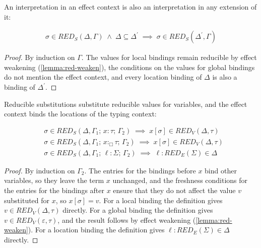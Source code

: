 \documentclass[acmsmall, screen, review, anonymous]{acmart}
\theoremstyle{definition}
\newcommand{\loc}{\ell}
\newcommand{\types}{\mathrel{:}}
\newcommand{\gtypes}{\mathrel{:_{\Box}}}
\newcommand{\cempty}{\varepsilon}
\newcommand{\ccons}[2]{#1;\,#2}
\newcommand{\lbind}[3]{\ccons{#1}{#2\types#3}}
\newcommand{\gbind}[3]{\ccons{#1}{#2\gtypes#3}}
\newcommand{\redname}{RED}
\newcommand{\redvname}{\redname_{V}}
\newcommand{\redv}[2]{\redvname{({#1},{#2})}}
\newcommand{\redsname}{\redname_{S}}
\newcommand{\reds}[2]{\redsname{({#1},{#2})}}
\newcommand{\redsigname}{\redname_{E}}
\newcommand{\redsig}[1]{\redsigname{(#1)}}
\begin{document}
An interpretation in an effect context is also an interpretation in
any extension of it:
\begin{lemma}
\label{lemma:red-subst-weaken}
\begin{align*}
  \sigma \in \reds{\Delta}{\Gamma}
  \; \wedge \; \Delta \subseteq \Delta^{\prime}
  \; \implies \;
  \sigma \in \reds{\Delta^{\prime}}{\Gamma}
\end{align*}
\end{lemma}
\begin{proof}
  By induction on $\Gamma$. The values for local bindings remain
  reducible by effect weakening (\ref{lemma:red-weaken}), the
  conditions on the values for global bindings do not mention the
  effect context, and every location binding of $\Delta$ is also a
  binding of $\Delta^{\prime}$.
\end{proof}

Reducible substitutions substitute reducible values for variables, and
the effect context binds the locations of the typing context:
\begin{lemma}
\label{lemma:red-subst-var}
\begin{align*}
  &\sigma \in \reds{\Delta}{\ccons{\lbind{\Gamma_1}{x}{\tau}}{\Gamma_2}}
    \; \implies \;
    x[\sigma] \in \redv{\Delta}{\tau} \\
  &\sigma \in \reds{\Delta}{\ccons{\gbind{\Gamma_1}{x}{\tau}}{\Gamma_2}}
    \; \implies \;
    x[\sigma] \in \redv{\Delta}{\tau} \\
  &\sigma \in \reds{\Delta}{\ccons{\lbind{\Gamma_1}{\loc}{\Sigma}}{\Gamma_2}}
    \; \implies \;
    \loc \types \redsig{\Sigma} \in \Delta
\end{align*}
\end{lemma}
\begin{proof}
  By induction on $\Gamma_2$. The entries for the bindings before $x$
  bind other variables, so they leave the term $x$ unchanged, and the
  freshness conditions for the entries for the bindings after $x$
  ensure that they do not affect the value $v$ substituted for $x$, so
  $x[\sigma] = v$. For a local binding the definition gives
  $v \in \redv{\Delta}{\tau}$ directly. For a global binding the
  definition gives $v \in \redv{\cempty}{\tau}$, and the result follows
  by effect weakening (\ref{lemma:red-weaken}). For a location binding
  the definition gives $\loc \types \redsig{\Sigma} \in \Delta$
  directly.
\end{proof}
\end{document}
